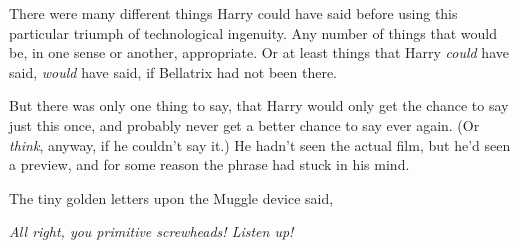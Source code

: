 There were many different things Harry could have said before using this particular triumph of technological ingenuity. Any number of things that would be, in one sense or another, appropriate. Or at least things that Harry \emph{could} have said, \emph{would} have said, if Bellatrix had not been there.

But there was only one thing to say, that Harry would only get the chance to say just this once, and probably never get a better chance to say ever again. (Or \emph{think}, anyway, if he couldn’t say it.) He hadn’t seen the actual film, but he’d seen a preview, and for some reason the phrase had stuck in his mind.

The tiny golden letters upon the Muggle device said,

\emph{All right, you primitive screwheads! Listen up!}

